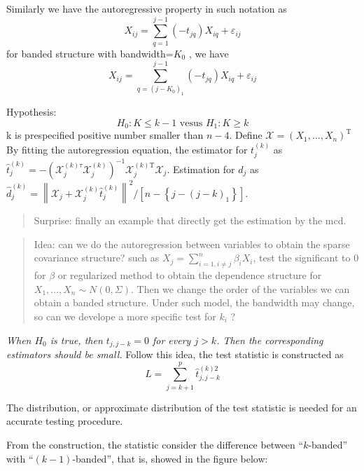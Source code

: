 \documentclass{beamer}
\begin{document}
\begin{frame}
Similarly we
have the autoregressive property in such notation as \[
X _ { i j } = \sum _ { q = 1 } ^ { j - 1 } \left( - t _ { j q } \right) X _ { i q } + \varepsilon _ { i j }
\] for banded structure with bandwidth=\(K_0\) , we have \[
X _ { i j } = \sum _ { q = \left( j - K _ { 0 } \right) _ { 1 } } ^ { j - 1 } \left( - t _ { j q } \right) X _ { i q } + \varepsilon _ { i j }
\]

\end{frame}

\begin{frame}

Hypothesis: \[
H_0: K\leqslant k-1 \text{   vesus } H_1:K\geqslant k
\] k is prespecified positive number smaller than \(n-4\). Define
\(\mathcal { X } = \left( X _ { 1 } , \dots , X _ { n } \right) ^ { \mathrm { T } }\)
By fitting the autoregression equation, the estimator for \(t^{(k)}_j\)
as
\(\hat { t } _ { j } ^ { ( k ) } = - \left( \mathcal { X } _ { j } ^ { ( k ) \tau } \mathcal { X } _ { j } ^ { ( k ) } \right) ^ { - 1 } \mathcal { X } _ { j } ^ { ( k ) \mathrm { T } } \mathcal { X } _ { j }\).
Estimation for \(d_j\) as
\(\hat d_j^{(k)}=\left\| \mathcal { X } _ { j } + \mathcal { X } _ { j } ^ { ( k ) } \hat { t } _ { j } ^ { ( k ) } \right\| ^ { 2 } / \left[ n - \left\{ j - ( j - k ) _ { 1 } \right\} \right]\).

\begin{quote}
Surprise: finally an example that directly get the estimation by the
mcd.
\end{quote}
\end{frame}

\begin{frame}
\begin{quote}

Idea: can we do the autoregression between variables to obtain the
sparse covariance structure? such as
\(X_j=\sum_{i=1,i\neq j}^n \beta_i X_i\), test the significant to 0 for
\(\beta\) or regularized method to obtain the dependence structure for
\(X_1,...,X_n\sim N(0,\Sigma)\). Then we change the order of the
variables we can obtain a banded structure. Under such model, the
bandwidth may change, so can we develope a more specific test for
\(k_i\) ?

\end{quote}
\end{frame}

\begin{frame}

\emph{When \(H_0\) is true, then \(t_{j,j-k}=0\) for every \(j>k\). Then
the corresponding estimators should be small.} Follow this idea, the
test statistic is constructed as \[
L=\sum_{j=k+1}^p \hat t_{j,j-k}^{(k)2}
\]

The distribution, or approximate distribution of the test statistic is
needed for an accurate testing procedure.

From the construction, the statistic consider the difference between
``\(k\)-banded'' with ``\((k-1)\)-banded'', that is, showed in the
figure below:
\end{frame}
\end{document}
